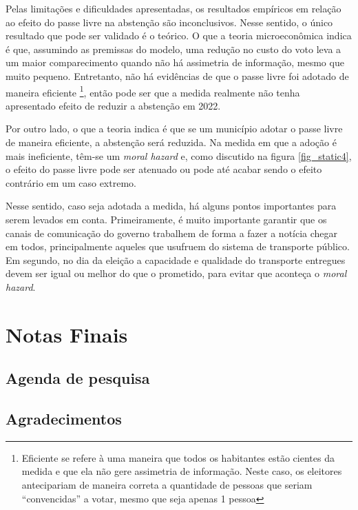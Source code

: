 Pelas limitações e dificuldades apresentadas, os resultados empíricos em relação ao efeito do passe livre na abstenção são inconclusivos. Nesse sentido, o único resultado que pode ser validado é o teórico. O que a teoria microeconômica indica é que, assumindo as premissas do modelo, uma redução no custo do voto leva a um maior comparecimento quando não há assimetria de informação, mesmo que muito pequeno. Entretanto, não há evidências de que o passe livre foi adotado de maneira eficiente \footnote{Eficiente se refere à uma maneira que todos os habitantes estão cientes da medida e que ela não gere assimetria de informação. Neste caso, os eleitores antecipariam de maneira correta a quantidade de pessoas que seriam ``convencidas'' a votar, mesmo que seja apenas 1 pessoa}, então pode ser que a medida realmente não tenha apresentado efeito de reduzir a abstenção em 2022.

Por outro lado, o que a teoria indica é que se um município adotar o passe livre de maneira eficiente, a abstenção será reduzida. Na medida em que a adoção é mais ineficiente, têm-se um \textit{moral hazard} e, como discutido na figura \ref{fig_static4}, o efeito do passe livre pode ser atenuado ou pode até acabar sendo o efeito contrário em um caso extremo. 

Nesse sentido, caso seja adotada a medida, há alguns pontos importantes para serem levados em conta. Primeiramente, é muito importante garantir que os canais de comunicação do governo trabalhem de forma a fazer a notícia chegar em todos, principalmente aqueles que usufruem do sistema de transporte público. Em segundo, no dia da eleição a capacidade e qualidade do transporte entregues devem ser igual ou melhor do que o prometido, para evitar que aconteça o \textit{moral hazard}.

\section{Notas Finais}

\subsection{Agenda de pesquisa}

\subsection{Agradecimentos}